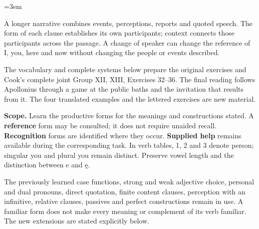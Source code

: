 \newcommand{\runningtitle}{Unit 16. Narrative and speech}

\emergencystretch=3em
\newcommand{\itempara}[2]{\par\addvspace{3pt}\noindent\hangindent=1.8em\hangafter=1\makebox[1.8em][l]{#1.}#2\par}
\newcommand{\reserve}[1]{\par\penalty-100\begingroup\dimen0=\pagegoal\advance\dimen0 by-\pagetotal\ifdim\dimen0<#1\newpage\fi\endgroup}

\raggedright
{}

A longer narrative combines events, perceptions, reports and quoted speech. The form of each clause establishes its own participants; context connects those participants across the passage. A change of speaker can change the reference of I, you, here and now without changing the people or events described.

The vocabulary and complete systems below prepare the original exercises and Cook’s complete joint Group XII, XIII, Exercises 32–36. The final reading follows Apollonius through a game at the public baths and the invitation that results from it. The four translated examples and the lettered exercises are new material.

\textbf{Scope.} Learn the productive forms for the meanings and constructions stated. A \textbf{reference} form may be consulted; it does not require unaided recall. \textbf{Recognition} forms are identified where they occur. \textbf{Supplied help} remains available during the corresponding task. In verb tables, 1, 2 and 3 denote person; singular you and plural you remain distinct. Preserve vowel length and the distinction between e and ę.

The previously learned case functions, strong and weak adjective choice, personal and dual pronouns, direct quotation, finite content clauses, perception with an infinitive, relative clauses, passives and perfect constructions remain in use. A familiar form does not make every meaning or complement of its verb familiar. The new extensions are stated explicitly below.

